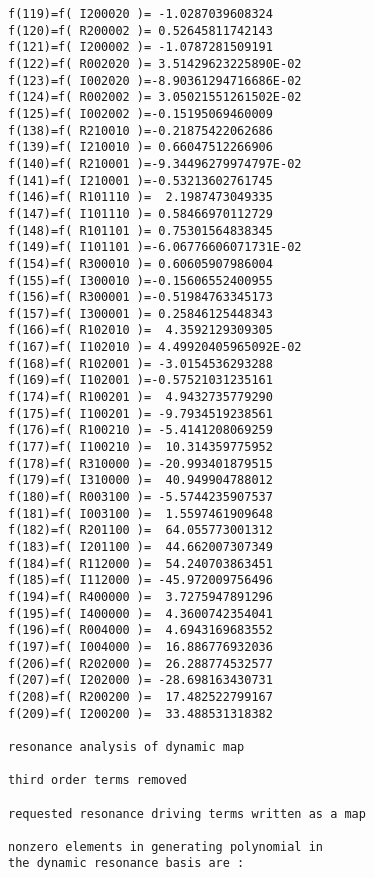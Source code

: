 \begin{footnotesize}
\begin{verbatim}
f(119)=f( I200020 )= -1.0287039608324
f(120)=f( R200002 )= 0.52645811742143
f(121)=f( I200002 )= -1.0787281509191
f(122)=f( R002020 )= 3.51429623225890E-02
f(123)=f( I002020 )=-8.90361294716686E-02
f(124)=f( R002002 )= 3.05021551261502E-02
f(125)=f( I002002 )=-0.15195069460009
f(138)=f( R210010 )=-0.21875422062686
f(139)=f( I210010 )= 0.66047512266906
f(140)=f( R210001 )=-9.34496279974797E-02
f(141)=f( I210001 )=-0.53213602761745
f(146)=f( R101110 )=  2.1987473049335
f(147)=f( I101110 )= 0.58466970112729
f(148)=f( R101101 )= 0.75301564838345
f(149)=f( I101101 )=-6.06776606071731E-02
f(154)=f( R300010 )= 0.60605907986004
f(155)=f( I300010 )=-0.15606552400955
f(156)=f( R300001 )=-0.51984763345173
f(157)=f( I300001 )= 0.25846125448343
f(166)=f( R102010 )=  4.3592129309305
f(167)=f( I102010 )= 4.49920405965092E-02
f(168)=f( R102001 )= -3.0154536293288
f(169)=f( I102001 )=-0.57521031235161
f(174)=f( R100201 )=  4.9432735779290
f(175)=f( I100201 )= -9.7934519238561
f(176)=f( R100210 )= -5.4141208069259
f(177)=f( I100210 )=  10.314359775952
f(178)=f( R310000 )= -20.993401879515
f(179)=f( I310000 )=  40.949904788012
f(180)=f( R003100 )= -5.5744235907537
f(181)=f( I003100 )=  1.5597461909648
f(182)=f( R201100 )=  64.055773001312
f(183)=f( I201100 )=  44.662007307349
f(184)=f( R112000 )=  54.240703863451
f(185)=f( I112000 )= -45.972009756496
f(194)=f( R400000 )=  3.7275947891296
f(195)=f( I400000 )=  4.3600742354041
f(196)=f( R004000 )=  4.6943169683552
f(197)=f( I004000 )=  16.886776932036
f(206)=f( R202000 )=  26.288774532577
f(207)=f( I202000 )= -28.698163430731
f(208)=f( R200200 )=  17.482522799167
f(209)=f( I200200 )=  33.488531318382

resonance analysis of dynamic map

third order terms removed

requested resonance driving terms written as a map

nonzero elements in generating polynomial in
the dynamic resonance basis are :


\end{verbatim}
\end{footnotesize}
